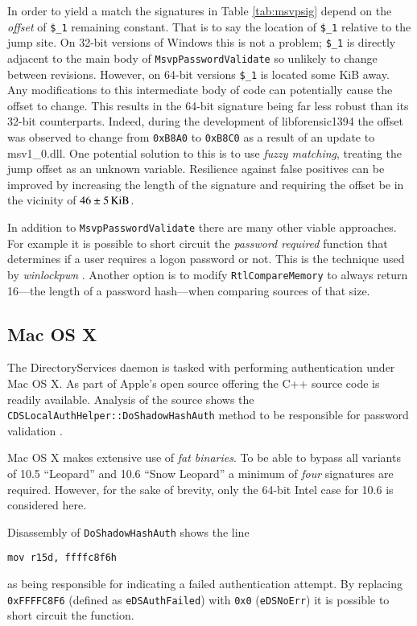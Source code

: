 \documentclass[numbers=noenddot,      %
               abstract,              %
               captions=tableheading, %
               DIV=8]                 %
              {scrartcl}
\begin{document}
In order to yield a match the signatures in Table \ref{tab:msvpsig}
depend on the \emph{offset} of \verb:$_1: remaining constant. That is to
say the location of \verb:$_1: relative to the jump site. On 32-bit
versions of Windows this is not a problem; \verb:$_1: is directly
adjacent to the main body of \verb:MsvpPasswordValidate: so unlikely to
change between revisions. However, on 64-bit versions \verb:$_1: is
located some \unit[46]{KiB} away. Any modifications to this intermediate
body of code can potentially cause the offset to change. This results in
the 64-bit signature being far less robust than its 32-bit
counterparts. Indeed, during the development of libforensic1394 the
offset was observed to change from \verb:0xB8A0: to \verb:0xB8C0: as a
result of an update to msv1\_0.dll. One potential solution to this is to
use \emph{fuzzy matching}, treating the jump offset as an unknown
variable. Resilience against false positives can be improved by
increasing the length of the signature and requiring the offset be in
the vicinity of $\unit[46 \pm 5]{KiB}$.

In addition to \verb:MsvpPasswordValidate: there are many other viable
approaches. For example it is possible to short circuit the
\emph{password required} function that determines if a user requires a
logon password or not. This is the technique used by \emph{winlockpwn}
\citep{boileau08}. Another option is to modify \verb:RtlCompareMemory:
to always return 16---the length of a password hash---when comparing
sources of that size.

\subsection{Mac OS X}
The DirectoryServices daemon is tasked with performing authentication
under Mac OS X. As part of Apple's open source offering the C++ source
code is readily available. Analysis of the source shows
the \verb!CDSLocalAuthHelper::DoShadowHashAuth! method to be responsible
for password validation \citep{apple05}.

Mac OS X makes extensive use of \emph{fat binaries}. To be able to
bypass all variants of 10.5 ``Leopard'' and 10.6 ``Snow Leopard'' a
minimum of \emph{four} signatures are required. However, for the sake of
brevity, only the 64-bit Intel case for 10.6 is considered here.

Disassembly of \verb:DoShadowHashAuth: shows the line
\begin{center}
\lstinline[language={[x86masm]Assembler},basicstyle=\small\ttfamily]
{mov r15d, ffffc8f6h}
\end{center}
as being responsible for indicating a failed authentication attempt. By
replacing \verb:0xFFFFC8F6: (defined as \verb:eDSAuthFailed:) with
\verb:0x0: (\verb:eDSNoErr:) it is possible to short circuit the
function.
\end{document}
